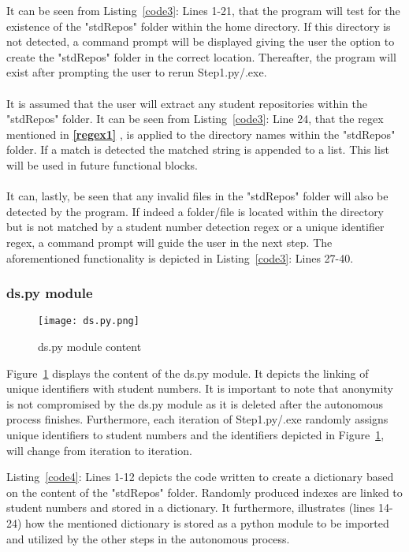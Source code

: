 It can be seen from Listing~\ref{code3}: Lines 1-21, that the program will test for the existence of the "stdRepos" folder within the home directory. If this directory is not detected, a command prompt will be displayed giving the user the option to create the "stdRepos" folder in the correct location. Thereafter, the program will exist after prompting the user to rerun Step1.py/.exe.
\\\\
It is assumed that the user will extract any student repositories within the "stdRepos" folder. It can be seen from Listing~\ref{code3}: Line 24, that the regex mentioned in \textbf{\ref{regex1} }, is applied to the directory names within the "stdRepos" folder. If a match is detected the matched string is appended to a list. This list will be used in future functional blocks. 
\\\\
It can, lastly, be seen that any invalid files in the "stdRepos" folder will also be detected by the program. If indeed a folder/file is located within the directory but is not matched by a student number detection regex or a unique identifier regex, a command prompt will guide the user in the next step. The aforementioned functionality is depicted in Listing~\ref{code3}: Lines 27-40.

\subsubsection{ds.py module}
\label{ds}
\begin{figure}[H]
\begin{center}
\texttt{[image: ds.py.png]}
\caption{ds.py module content}
\label{ds.pyCon}
\end{center}
\end{figure}

Figure~\ref{ds.pyCon} displays the content of the ds.py module. It depicts the linking of unique identifiers with student numbers. It is important to note that anonymity is not compromised by the ds.py module as it is deleted after the autonomous process finishes. Furthermore, each iteration of Step1.py/.exe randomly assigns unique identifiers to student numbers and the identifiers depicted in Figure~\ref{ds.pyCon}, will change from iteration to iteration. 



Listing~\ref{code4}: Lines 1-12 depicts the code written to create a dictionary based on the content of the "stdRepos" folder. Randomly produced indexes are linked to student numbers and stored in a dictionary. It furthermore, illustrates (lines 14-24) how the mentioned dictionary is stored as a python module to be imported and utilized by the other steps in the autonomous process. 

